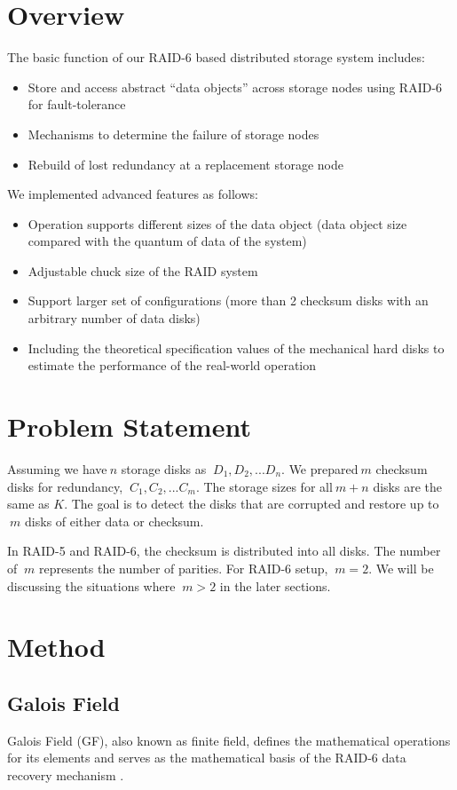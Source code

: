 \documentclass[journal]{IEEEtran}
\begin{document}
\section{Overview}
The basic function of our RAID-6 based distributed storage system includes:
\begin{itemize}
    \item Store and access abstract “data objects” across storage nodes using RAID-6 for fault-tolerance
    \item Mechanisms to determine the failure of storage nodes
    \item Rebuild of lost redundancy at a replacement storage node
\end{itemize}
We implemented advanced features as follows:
\begin{itemize}
    \item Operation supports different sizes of the data object (data object size compared with the quantum of data of the system)
    \item Adjustable chuck size of the RAID system
    \item Support larger set of configurations (more than 2 checksum disks with an arbitrary number of data disks)
    \item Including the theoretical specification values of the mechanical hard disks to estimate the performance of the real-world operation
\end{itemize}

\section{Problem Statement}
Assuming we have\(\ n \) storage disks as \(\ D_1, D_2, ... D_n\). We prepared\(\ m \) checksum disks for redundancy, \(\ C_1, C_2, ... C_m\). The storage sizes for all\(\ m + n \) disks are the same as \( K \). The goal is to detect the disks that are corrupted and restore up to \(\ m \) disks of either data or checksum.

In RAID-5 and RAID-6, the checksum is distributed into all disks. The number of \(\ m \) represents the number of parities. For RAID-6 setup, \(\ m = 2\). We will be discussing the situations where \(\ m > 2\) in the later sections.

\section{Method}
\subsection{Galois Field}
Galois Field (GF), also known as finite field, defines the mathematical operations for its elements and serves as the mathematical basis of the RAID-6 data recovery mechanism \cite{2007math_of_RAID, 1997Tutorial_Reed, Math_GF}. 
\end{document}
